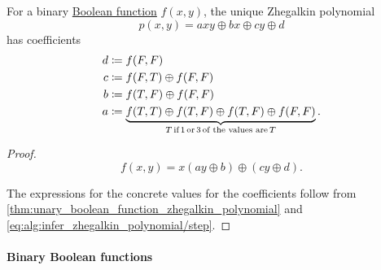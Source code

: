 \begin{proposition}\label{thm:binary_boolean_function_zhegalkin_polynomial}
  For a binary \hyperref[def:boolean_function]{Boolean function} \( f(x, y) \), the unique Zhegalkin polynomial
  \begin{equation}\label{eq:thm:binary_boolean_function_zhegalkin_polynomial}
    p(x, y) = axy \oplus bx \oplus cy \oplus d
  \end{equation}
  has coefficients
  \begin{align*}
    d &\coloneqq f(F, F) \\
    c &\coloneqq f(F, T) \oplus f(F, F) \\
    b &\coloneqq f(T, F) \oplus f(F, F) \\
    a &\coloneqq \underbrace{f(T, T) \oplus f(T, F) \oplus f(T, F) \oplus f(F, F)}_{T \T*{if} 1 \T*{or} 3 \T*{of the values are} T}.
  \end{align*}
\end{proposition}
\begin{proof}
  \begin{equation*}
    f(x, y) = x(ay \oplus b) \oplus (cy \oplus d).
  \end{equation*}

  The expressions for the concrete values for the coefficients follow from \cref{thm:unary_boolean_function_zhegalkin_polynomial} and \eqref{eq:alg:infer_zhegalkin_polynomial/step}.
\end{proof}

\paragraph{Binary Boolean functions}

